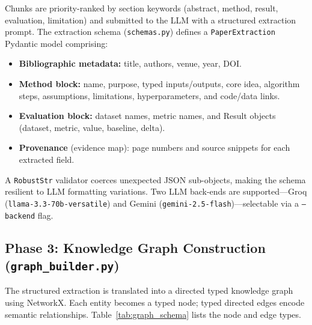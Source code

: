 \documentclass[conference]{IEEEtran}
\begin{document}
Chunks are priority-ranked by section keywords (abstract, method,
result, evaluation, limitation) and submitted to the LLM with a
structured extraction prompt. The extraction schema
(\texttt{schemas.py}) defines a \texttt{PaperExtraction}
Pydantic model comprising:

\begin{itemize}
  \item \textbf{Bibliographic metadata:} title, authors, venue, year, DOI.
  \item \textbf{Method block:} name, purpose, typed inputs/outputs, core
  idea, algorithm steps, assumptions, limitations, hyperparameters, and
  code/data links.
  \item \textbf{Evaluation block:} dataset names, metric names, and
  Result objects (dataset, metric, value, baseline, delta).
  \item \textbf{Provenance} (evidence map): page numbers and source
  snippets for each extracted field.
\end{itemize}

A \texttt{RobustStr} validator coerces unexpected JSON sub-objects,
making the schema resilient to LLM formatting variations. Two LLM
back-ends are supported---Groq (\texttt{llama-3.3-70b-versatile}) and
Gemini (\texttt{gemini-2.5-flash})---selectable via a \texttt{--backend}
flag.

\subsection{Phase 3: Knowledge Graph Construction (\texttt{graph\_builder.py})}
\label{sec:graph}

The structured extraction is translated into a directed typed
knowledge graph using NetworkX. Each entity becomes a typed node;
typed directed edges encode semantic relationships.
Table~\ref{tab:graph_schema} lists the node and edge types.
\end{document}
